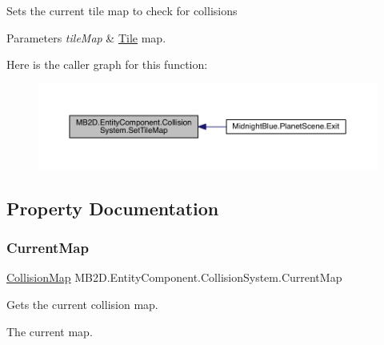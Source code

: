 Sets the current tile map to check for collisions 


\begin{DoxyParams}{Parameters}
{\em tile\+Map} & \hyperlink{class_m_b2_d_1_1_tile}{Tile} map.\\
\hline
\end{DoxyParams}
Here is the caller graph for this function\+:\nopagebreak
\begin{figure}[H]
\begin{center}
\leavevmode
\includegraphics[width=350pt]{class_m_b2_d_1_1_entity_component_1_1_collision_system_a4710a6cf7aba7b5ba9c75e0771793b93_icgraph}
\end{center}
\end{figure}


\subsection{Property Documentation}
\hypertarget{class_m_b2_d_1_1_entity_component_1_1_collision_system_a338aebc3f288cf68926074026af3dbba}{}\label{class_m_b2_d_1_1_entity_component_1_1_collision_system_a338aebc3f288cf68926074026af3dbba} 
\subsubsection{\texorpdfstring{Current\+Map}{CurrentMap}}
{\footnotesize\ttfamily \hyperlink{class_m_b2_d_1_1_collision_1_1_collision_map}{Collision\+Map} M\+B2\+D.\+Entity\+Component.\+Collision\+System.\+Current\+Map\hspace{0.3cm}{\ttfamily [get]}}



Gets the current collision map. 

The current map.\hypertarget{class_m_b2_d_1_1_entity_component_1_1_collision_system_a9448df47918780c8287b6f7ff177d46f}{}\label{class_m_b2_d_1_1_entity_component_1_1_collision_system_a9448df47918780c8287b6f7ff177d46f} 
